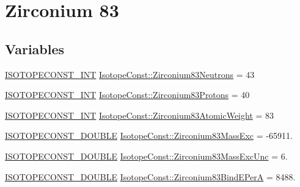 \hypertarget{group___isotope_const-_zirconium-_zr83}{}\section{Zirconium 83}
\label{group___isotope_const-_zirconium-_zr83}
\subsection*{Variables}
\begin{DoxyCompactItemize}
\item 
\mbox{\hyperlink{group___isotope_const-_macros_ga5f18360b3e99483a35c32d789e62621c}{I\+S\+O\+T\+O\+P\+E\+C\+O\+N\+S\+T\+\_\+\+I\+NT}} \mbox{\hyperlink{group___isotope_const-_zirconium-_zr83_ga5e4393a75fce9da4c2c9e694ce7f11a3}{Isotope\+Const\+::\+Zirconium83\+Neutrons}} = 43
\item 
\mbox{\hyperlink{group___isotope_const-_macros_ga5f18360b3e99483a35c32d789e62621c}{I\+S\+O\+T\+O\+P\+E\+C\+O\+N\+S\+T\+\_\+\+I\+NT}} \mbox{\hyperlink{group___isotope_const-_zirconium-_zr83_gabcb619db07d40426dcb9554f4eeafcb9}{Isotope\+Const\+::\+Zirconium83\+Protons}} = 40
\item 
\mbox{\hyperlink{group___isotope_const-_macros_ga5f18360b3e99483a35c32d789e62621c}{I\+S\+O\+T\+O\+P\+E\+C\+O\+N\+S\+T\+\_\+\+I\+NT}} \mbox{\hyperlink{group___isotope_const-_zirconium-_zr83_gab0a372002806c7136511fcbf4441184f}{Isotope\+Const\+::\+Zirconium83\+Atomic\+Weight}} = 83
\item 
\mbox{\hyperlink{group___isotope_const-_macros_ga8f45a7272ce02c0b4c65c44636ed719a}{I\+S\+O\+T\+O\+P\+E\+C\+O\+N\+S\+T\+\_\+\+D\+O\+U\+B\+LE}} \mbox{\hyperlink{group___isotope_const-_zirconium-_zr83_gace197774e6069635e576b2cd8bd6bfba}{Isotope\+Const\+::\+Zirconium83\+Mass\+Exc}} = -\/65911.
\item 
\mbox{\hyperlink{group___isotope_const-_macros_ga8f45a7272ce02c0b4c65c44636ed719a}{I\+S\+O\+T\+O\+P\+E\+C\+O\+N\+S\+T\+\_\+\+D\+O\+U\+B\+LE}} \mbox{\hyperlink{group___isotope_const-_zirconium-_zr83_gaa3d026647909f236da62b869820df78e}{Isotope\+Const\+::\+Zirconium83\+Mass\+Exc\+Unc}} = 6.
\item 
\mbox{\hyperlink{group___isotope_const-_macros_ga8f45a7272ce02c0b4c65c44636ed719a}{I\+S\+O\+T\+O\+P\+E\+C\+O\+N\+S\+T\+\_\+\+D\+O\+U\+B\+LE}} \mbox{\hyperlink{group___isotope_const-_zirconium-_zr83_ga8a928c46a7e5b69398cfc7767dec871b}{Isotope\+Const\+::\+Zirconium83\+Bind\+E\+PerA}} = 8488.
\item 

\end{DoxyCompactItemize}
